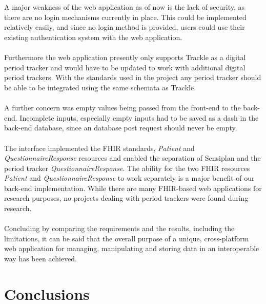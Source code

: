 \documentclass[
a4paper,
11pt
]{article}
\begin{document}
	\\
	\\%
	A major weakness of the web application as of now is the lack of security, as there are no login mechanisms currently in place. This could be implemented relatively easily, and since no login method is provided, users could use their existing authentication system with the web application.
	\\
	\\
	Furthermore the web application presently only supports Trackle as a digital period tracker and would have to be updated to work with additional digital period trackers. With the standards used in the project any period tracker should be able to be integrated using the same schemata as Trackle.
	\\
	\\%
	A further concern was empty values being passed from the front-end to the back-end. Incomplete inputs, especially empty inputs had to be saved as a dash in the back-end database, since an database post request should never be empty.
	\\
	\\%
	The interface implemented the \ac{FHIR} standards, \textit{Patient} and \textit{QuestionnaireResponse} resources and enabled the separation of Sensiplan\textsuperscript{\textcopyright} and the period tracker \textit{QuestionnaireResponse}. The ability for the two \ac{FHIR} resources \textit{Patient} and \textit{QuestionnaireResponse} to work separately is a major benefit of our back-end implementation. While there are many \ac{FHIR}-based web applications for research purposes, no projects dealing with period trackers were found during research.
	\\
	\\%
	Concluding by comparing the requirements and the results, including the limitations, it can be said that the overall purpose of a unique, cross-platform web application for managing, manipulating and storing data in an interoperable way has been achieved.
	\newpage
	\section{Conclusions}
	
\end{document}
